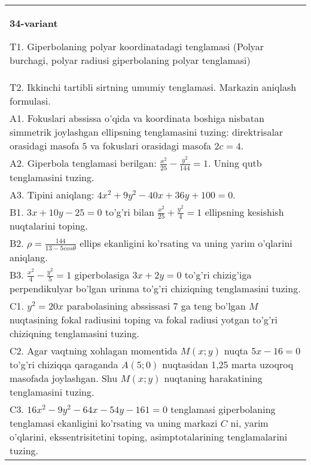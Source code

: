 \documentclass{article}
\begin{document}
\begin{tabular}{m{17cm}}
\textbf{34-variant}
\newline

T1. Giperbolaning polyar koordinatadagi tenglamasi (Polyar burchagi, polyar radiusi giperbolaning polyar tenglamasi)\\

T2. Ikkinchi tartibli sirtning umumiy tenglamasi. Markazin aniqlash formulasi.\\

A1. Fokuslari abssissa o'qida va koordinata boshiga nisbatan simmetrik joylashgan ellipsning tenglamasini tuzing: direktrisalar orasidagi masofa $5$ va fokuslari orasidagi masofa $2c=4$.\\

A2. Giperbola tenglamasi berilgan: $\frac{x^{2}}{25}-\frac{y^{2}}{144}=1$. Uning qutb tenglamasini tuzing.\\

A3. Tipini aniqlang: $4x^2+9y^2-40x+36y+100=0$.\\

B1. $3x + 10y - 25 = 0$ to'g'ri bilan $\frac{x^{2}}{25} + \frac{y^{2}}{4} = 1$ ellipsning kesishish nuqtalarini toping.  \\

B2. $\rho = \frac{144}{13 - 5cos\theta}$ ellips ekanligini ko'rsating va uning yarim o'qlarini aniqlang.\\

B3. $\frac{x^{2}}{4} - \frac{y^{2}}{5} = 1$ giperbolasiga $3x + 2y = 0$ to'g'ri chizig'iga perpendikulyar bo'lgan urinma to'g'ri chiziqning tenglamasini tuzing.\\

C1. $y^{2} = 20x$ parabolasining abssissasi 7 ga teng bo'lgan $M$ nuqtasining fokal radiusini toping va fokal radiusi yotgan to'g'ri chiziqning tenglamasini tuzing.  \\

C2. Agar vaqtning xohlagan momentida $M(x;y)$ nuqta $5x - 16 = 0$ to'g'ri chiziqqa qaraganda $A(5;0)$ nuqtasidan 1,25 marta uzoqroq masofada joylashgan. Shu $M(x;y)$ nuqtaning harakatining tenglamasini tuzing.  \\

C3. $16x^{2} - 9y^{2} - 64x - 54y - 161 = 0$ tenglamasi giperbolaning tenglamasi ekanligini ko'rsating va uning markazi $C$ ni, yarim o'qlarini, ekssentrisitetini toping, asimptotalarining tenglamalarini tuzing.  \\

\end{tabular}
\vspace{1cm}
\end{document}
